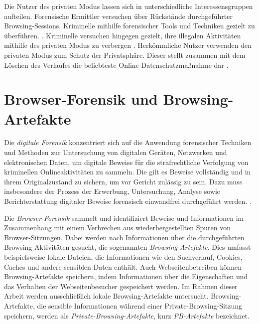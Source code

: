Die Nutzer des privaten Modus lassen sich in unterschiedliche Interessensgruppen aufteilen. 
Forensische Ermittler versuchen über Rückstände durchgeführter Browsing-Sessions, Kriminelle mithilfe forensischer Tools und Techniken gezielt zu überführen. \cite{Montasari.2015}. Kriminelle versuchen hingegen gezielt, ihre illegalen Aktivitäten mithilfe des privaten Modus zu verbergen \cite{Mahlous.2020}. 
Herkömmliche Nutzer verwenden den privaten Modus zum Schutz der Privatsphäre. Dieser stellt zusammen mit dem Löschen des Verlaufes die beliebteste Online-Datenschutzmaßnahme dar \cite{Horsman.2019}. 

\section{Browser-Forensik und Browsing-Artefakte}\label{chap:theorie-browser-forensics-artefakte} %

Die \textit{digitale Forensik} konzentriert sich auf die Anwendung forensischer Techniken und Methoden zur Untersuchung von digitalen Geräten, Netzwerken und elektronischen Daten, um digitale Beweise für die strafrechtliche Verfolgung von kriminellen Onlineaktivitäten zu sammeln.
Die gilt es Beweise vollständig und in ihrem Originalzustand zu sichern, um vor Gericht zulässig zu sein. Dazu muss insbesondere der Prozess der Erwerbung, Untersuchung, Analyse sowie Berichterstattung digitaler Beweise forensisch einwandfrei durchgeführt werden.  \cite{Izzati.2022}.

Die \textit{Browser-Forensik} sammelt und identifiziert Beweise und Informationen im Zusammenhang mit einem Verbrechen aus wiederhergestellten Spuren von Browser-Sitzungen. 
Dabei werden nach Informationen über die durchgeführten Browsing-Aktivitäten gesucht, die sogenannten \textit{Browsing-Artefakte}. 
Dies umfasst beispielsweise lokale Dateien, die Informationen wie den Suchverlauf, Cookies, Caches und andere sensiblen Daten enthält. Auch Webseitenbetreiben können Browsing-Artefakte speichern, indem Informationen über die Eigenschaften und das Verhalten der Webseitenbesucher gespeichert werden. Im Rahmen dieser Arbeit werden ausschließlich lokale Browsing-Artefakte untersucht.  \cite{Izzati.2022}
Browsing-Artefakte, die sensible Informationen während einer Private-Browsing-Sitzung speichern, werden als \textit{Private-Browsing-Artefakte}, kurz \textit{PB-Artefakte} bezeichnet.

